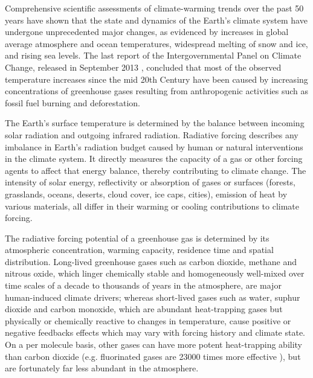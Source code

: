 Comprehensive  scientific assessments  of climate-warming  trends over
the  past 50  years have  shown  that the  state and  dynamics of  the
Earth's climate system have  undergone unprecedented major changes, as
evidenced  by  increases  in   global  average  atmosphere  and  ocean
temperatures,  widespread melting  of  snow and  ice,  and rising  sea
levels.   The last report  of the  Intergovernmental Panel  on Climate
Change, released  in September 2013  \citep{IPCC-2013}, concluded that
most of the observed temperature  increases since the mid 20th Century
have  been caused  by  increasing concentrations  of greenhouse  gases
resulting from  anthropogenic activities  such as fossil  fuel burning
and  deforestation.

The Earth's  surface temperature is determined by  the balance between
incoming  solar radiation and  outgoing infrared  radiation. Radiative
forcing describes any imbalance  in Earth's radiation budget caused by
human  or natural interventions  in the  climate system.   It directly
measures the capacity of a gas  or other forcing agents to affect that
energy balance, thereby contributing to climate change.  The intensity
of  solar energy,  reflectivity  or absorption  of  gases or  surfaces
(forests, grasslands, oceans, deserts, cloud cover, ice caps, cities),
emission of heat by various  materials, all differ in their warming or
cooling contributions to climate forcing.

The radiative forcing  potential of a greenhouse gas  is determined by
its  atmospheric concentration, warming  capacity, residence  time and
spatial  distribution.   Long-lived greenhouse  gases  such as  carbon
dioxide, methane and nitrous oxide, which linger chemically stable and
homogeneously well-mixed over time scales  of a decade to thousands of
years  in the  atmosphere,  are major  human-induced climate  drivers;
whereas  short-lived gases such  as water,  suphur dioxide  and carbon
monoxide,  which are  abundant heat-trapping  gases but  physically or
chemically  reactive  to changes  in  temperature,  cause positive  or
negative  feedbacks effects which  may vary  with forcing  history and
climate  state. On a  per molecule  basis, other  gases can  have more
potent  heat-trapping ability  than carbon  dioxide  (e.g. fluorinated
gases  are 23000  times more  effective \citep{Zehner-2012}),  but are
fortunately far less abundant in the atmosphere.

